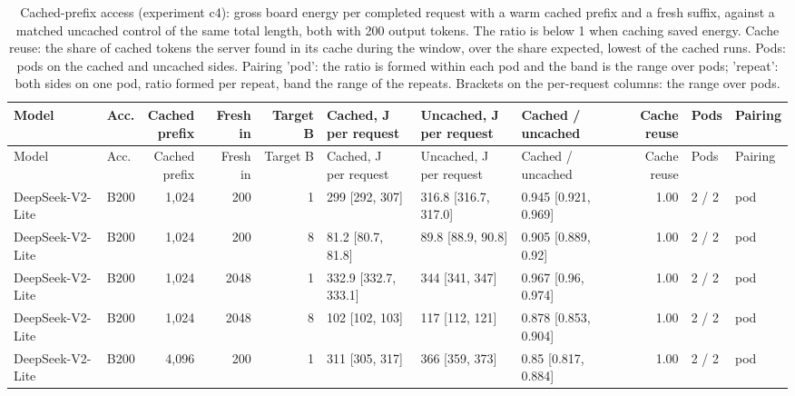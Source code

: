 \begin{landscape}
\begingroup
\scriptsize
\setlength{\tabcolsep}{3pt}
\begin{longtable}{llrrrlllrll}
\caption{Cached-prefix access (experiment c4): gross board energy per completed request with a warm cached prefix and a fresh suffix, against a matched uncached control of the same total length, both with 200 output tokens. The ratio is below 1 when caching saved energy. Cache reuse: the share of cached tokens the server found in its cache during the window, over the share expected, lowest of the cached runs. Pods: pods on the cached and uncached sides. Pairing 'pod': the ratio is formed within each pod and the band is the range over pods; 'repeat': both sides on one pod, ratio formed per repeat, band the range of the repeats. Brackets on the per-request columns: the range over pods.}\label{tab:cached}\\
\toprule
Model & Acc. & \makecell[r]{Cached\\prefix} & Fresh in & Target B & \makecell[l]{Cached, J\\per request} & \makecell[l]{Uncached, J\\per request} & \makecell[l]{Cached /\\uncached} & Cache reuse & Pods & Pairing \\
\midrule
\endfirsthead
\toprule
Model & Acc. & \makecell[r]{Cached\\prefix} & Fresh in & Target B & \makecell[l]{Cached, J\\per request} & \makecell[l]{Uncached, J\\per request} & \makecell[l]{Cached /\\uncached} & Cache reuse & Pods & Pairing \\
\midrule
\endhead
\bottomrule
\endfoot
DeepSeek-V2-Lite & B200 & 1,024 & 200 & 1 & 299 {[}292, 307{]} & 316.8 {[}316.7, 317.0{]} & 0.945 {[}0.921, 0.969{]} & 1.00 & 2 / 2 & pod \\
DeepSeek-V2-Lite & B200 & 1,024 & 200 & 8 & 81.2 {[}80.7, 81.8{]} & 89.8 {[}88.9, 90.8{]} & 0.905 {[}0.889, 0.92{]} & 1.00 & 2 / 2 & pod \\
DeepSeek-V2-Lite & B200 & 1,024 & 2048 & 1 & 332.9 {[}332.7, 333.1{]} & 344 {[}341, 347{]} & 0.967 {[}0.96, 0.974{]} & 1.00 & 2 / 2 & pod \\
DeepSeek-V2-Lite & B200 & 1,024 & 2048 & 8 & 102 {[}102, 103{]} & 117 {[}112, 121{]} & 0.878 {[}0.853, 0.904{]} & 1.00 & 2 / 2 & pod \\
DeepSeek-V2-Lite & B200 & 4,096 & 200 & 1 & 311 {[}305, 317{]} & 366 {[}359, 373{]} & 0.85 {[}0.817, 0.884{]} & 1.00 & 2 / 2 & pod \\

\end{longtable}
\end{landscape}
